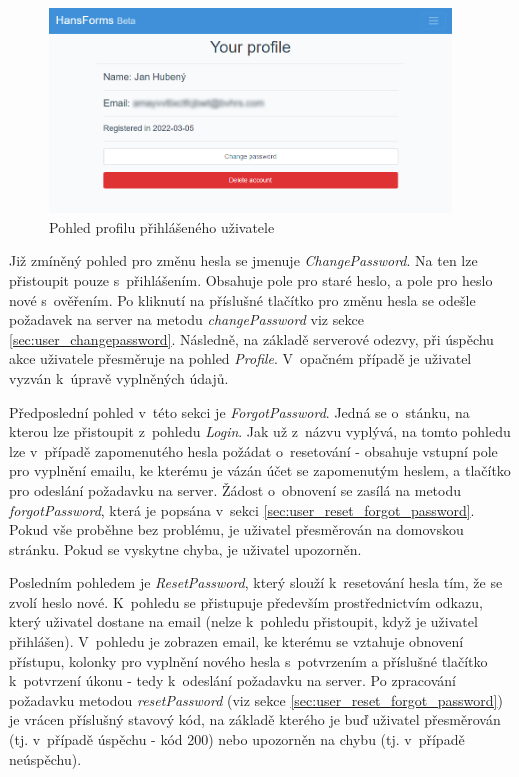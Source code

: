 		\begin{figure}[h]
			\centering
			\includegraphics[width=0.95\textwidth]{img/pohledy/profile.png}
			\caption{Pohled profilu přihlášeného uživatele}
			\label{fig:pohled_profile}
		\end{figure}
		
		Již zmíněný pohled pro změnu hesla se jmenuje \textit{ChangePassword}. Na ten lze přistoupit pouze s~přihlášením. Obsahuje pole pro staré heslo, a pole pro heslo nové s~ověřením. Po kliknutí na příslušné tlačítko pro změnu hesla se odešle požadavek na server na metodu \textit{changePassword} viz sekce \ref{sec:user_changepassword}. Následně, na základě serverové odezvy, při úspěchu akce uživatele přesměruje na pohled \textit{Profile}. V~opačném případě je uživatel vyzván k~úpravě vyplněných údajů.
		
		Předposlední pohled v~této sekci je \textit{ForgotPassword}. Jedná se o~stánku, na kterou lze přistoupit z~pohledu \textit{Login}. Jak už z~názvu vyplývá, na tomto pohledu lze v~případě zapomenutého hesla požádat o~resetování - obsahuje vstupní pole pro vyplnění emailu, ke kterému je vázán účet se zapomenutým heslem, a tlačítko pro odeslání požadavku na server. Žádost o~obnovení se zasílá na metodu \textit{forgotPassword}, která je popsána v~sekci \ref{sec:user_reset_forgot_password}. Pokud vše proběhne bez problému, je uživatel přesměrován na domovskou stránku. Pokud se vyskytne chyba, je uživatel upozorněn.
		
		Posledním pohledem je \textit{ResetPassword}, který slouží k~resetování hesla tím, že se zvolí heslo nové. K~pohledu se přistupuje především prostřednictvím odkazu, který uživatel dostane na email (nelze k~pohledu přistoupit, když je uživatel přihlášen). V~pohledu je zobrazen email, ke kterému se vztahuje obnovení přístupu, kolonky pro vyplnění nového hesla s~potvrzením a příslušné tlačítko k~potvrzení úkonu - tedy k~odeslání požadavku na server. Po zpracování požadavku metodou \textit{resetPassword} (viz sekce \ref{sec:user_reset_forgot_password}) je vrácen příslušný stavový kód, na základě kterého je buď uživatel přesměrován (tj. v~případě úspěchu - kód 200) nebo upozorněn na chybu (tj. v~případě neúspěchu).
		
